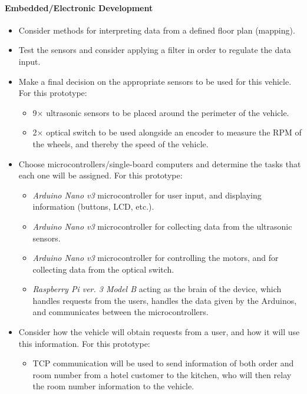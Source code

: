 \documentclass[11pt]{article}
\begin{document}
\paragraph{Embedded/Electronic Development}
\begin{itemize}
\item{Consider methods for interpreting data from a defined floor plan (mapping).}
\item{Test the sensors and consider applying a filter in order to regulate the data input.}
\item{Make a final decision on the appropriate sensors to be used for this vehicle. For this prototype:}
  \begin{itemize}
\item{9$\times$ ultrasonic sensors to be placed around the perimeter of the vehicle.}
\item{2$\times$ optical switch to be used alongside an encoder to measure the RPM of the wheels, and thereby the speed of the vehicle.}
  \end{itemize}
\item{Choose microcontrollers/single-board computers and determine the tasks that each one will be assigned. For this prototype:}
  \begin{itemize}
\item{\textit{Arduino Nano v3} microcontroller for user input, and displaying information (buttons, LCD, etc.).}
\item{\textit{Arduino Nano v3} microcontroller for collecting data from the ultrasonic sensors.}
\item{\textit{Arduino Nano v3} microcontroller for controlling the motors, and for collecting data from the optical switch.}
\item{\textit{Raspberry Pi ver. 3 Model B} acting as the brain of the device, which handles requests from the users, handles the data given by the Arduinos, and communicates between the microcontrollers.}
  \end{itemize}
\item{Consider how the vehicle will obtain requests from a user, and how it will use this information. For this prototype:}
  \begin{itemize}
  \item{TCP communication will be used to send information of both order and room number from a hotel customer to the kitchen, who will then relay the room number information to the vehicle.}
    \end{itemize}
\end{itemize}
\end{document}
